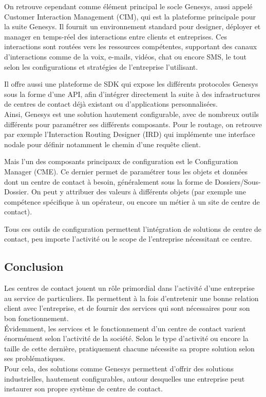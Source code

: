\documentclass{rapport}
\begin{document}
On retrouve cependant comme élément principal le socle Genesys, aussi appelé Customer Interaction Management (CIM), qui est la plateforme principale pour la suite Genesys. Il fournit un environnement standard pour designer, déployer et manager en temps-réel des interactions entre clients et entreprises.
Ces interactions sont routées vers les ressources compétentes, supportant des canaux d'interactions comme de la voix, e-mails, vidéos, chat ou encore SMS, le tout selon les configurations et stratégies de l'entreprise l'utilisant.

Il offre aussi une plateforme de SDK qui expose les différents protocoles Genesys sous la forme d'une API, afin d'intégrer directement la suite à des infrastructures de centres de contact déjà existant ou d'applications personnalisées.\\

Ainsi, Genesys est une solution hautement configurable, avec de nombreux outils différents pour paramétrer ses différents composants. Pour le routage, on retrouve par exemple l'Interaction Routing Designer (IRD) qui implémente une interface nodale pour définir notamment le chemin d'une requête client.

Mais l'un des composants principaux de configuration est le Configuration Manager (CME). Ce dernier permet de paramétrer tous les objets et données dont un centre de contact à besoin, généralement sous la forme de Dossiers/Sous-Dossier. On peut y attribuer des valeurs à différents objets (par exemple une compétence spécifique à un opérateur, ou encore un métier à un site de centre de contact).


Tous ces outils de configuration permettent l'intégration de solutions de centre de contact, peu importe l'activité ou le scope de l'entreprise nécessitant ce centre.

\subsection*{Conclusion}

Les centres de contact jouent un rôle primordial dans l'activité d'une entreprise au service de particuliers. Ils permettent à la fois d'entretenir une bonne relation client avec l'entreprise, et de fournir des services qui sont nécessaires pour son bon fonctionnement.\\
Évidemment, les services et le fonctionnement d'un centre de contact varient énormément selon l'activité de la société. Selon le type d'activité ou encore la taille de cette dernière, pratiquement chacune nécessite sa propre solution selon ses problématiques.\\
Pour cela, des solutions comme Genesys permettent d'offrir des solutions industrielles, hautement configurables, autour desquelles une entreprise peut instaurer son propre système de centre de contact.
\end{document}
